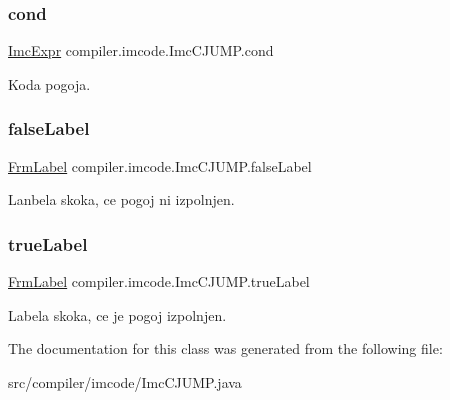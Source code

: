 \subsubsection{\texorpdfstring{cond}{cond}}
{\footnotesize\ttfamily \hyperlink{classcompiler_1_1imcode_1_1_imc_expr}{Imc\+Expr} compiler.\+imcode.\+Imc\+C\+J\+U\+M\+P.\+cond}

Koda pogoja. \mbox{\label{classcompiler_1_1imcode_1_1_imc_c_j_u_m_p_acf48b9439d6099fa19f10c96d2852613}} 
\subsubsection{\texorpdfstring{false\+Label}{falseLabel}}
{\footnotesize\ttfamily \hyperlink{classcompiler_1_1frames_1_1_frm_label}{Frm\+Label} compiler.\+imcode.\+Imc\+C\+J\+U\+M\+P.\+false\+Label}

Lanbela skoka, ce pogoj ni izpolnjen. \mbox{\label{classcompiler_1_1imcode_1_1_imc_c_j_u_m_p_afe718affa055b0d5fa58cb5011024adf}} 
\subsubsection{\texorpdfstring{true\+Label}{trueLabel}}
{\footnotesize\ttfamily \hyperlink{classcompiler_1_1frames_1_1_frm_label}{Frm\+Label} compiler.\+imcode.\+Imc\+C\+J\+U\+M\+P.\+true\+Label}

Labela skoka, ce je pogoj izpolnjen. 

The documentation for this class was generated from the following file\+:\begin{DoxyCompactItemize}
\item 
src/compiler/imcode/Imc\+C\+J\+U\+M\+P.\+java\end{DoxyCompactItemize}

